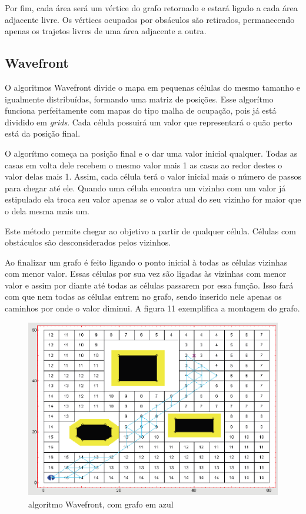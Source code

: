 Por fim, cada área será um vértice do grafo retornado e estará ligado a cada área adjacente livre.  Os vértices ocupados por obsáculos são retirados, permanecendo apenas os trajetos livres de uma área adjacente a outra.

\subsection{Wavefront}

O algoritmos Wavefront divide o mapa em pequenas células do mesmo tamanho e igualmente distribuídas, formando uma matriz de posições. Esse algorítmo funciona perfeitamente com mapas do tipo malha de ocupação, pois já está dividido em \textit{grids}. Cada célula possuirá um valor que representará o quão perto está da posição final.

O algorítmo começa na posição final e o dar uma valor inicial qualquer. Todas as casas em volta dele recebem o mesmo valor mais 1 as casas ao redor destes o valor delas mais 1. Assim, cada célula terá o valor inicial mais o número de passos para chegar até ele. Quando uma célula encontra um vizinho com um valor já estipulado ela troca seu valor apenas se o valor atual do seu vizinho for maior que o dela mesma mais um.

Este método permite chegar ao objetivo a partir de qualquer célula. Células com obstáculos são desconsiderados pelos vizinhos. 

Ao finalizar um grafo é feito ligando o ponto inicial à todas as células vizinhas com menor valor. Essas células por sua vez são ligadas às vizinhas com menor valor e assim por diante até todas as células passarem por essa função. Isso fará com que nem todas as células entrem no grafo, sendo inserido nele apenas os caminhos por onde o valor diminui. A figura 11 exemplifica a montagem do grafo.

\begin{figure}[h]
	\centering
	\label{fig11}
		\includegraphics[keepaspectratio=true,scale=0.5]{figuras/10wavefront.png}
	\caption{algorítmo Wavefront, com grafo em azul \cite{MRIT_SITE}}
\end{figure}

